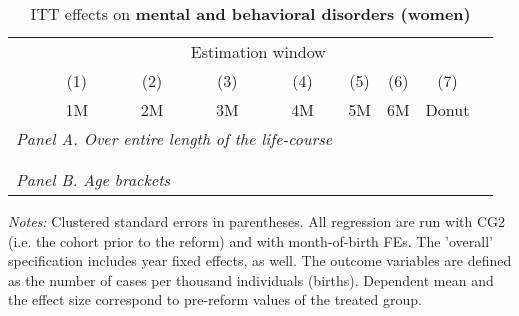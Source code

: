 \vspace*{\fill}
\begin{table}[H] \centering 
	\begin{threeparttable} \centering \caption{ITT effects on \textbf{mental and behavioral disorders (women)}}\label{tab: DD_hopsital2_total}
		{\def\sym#1{\ifmmode^{#1}\else\(^{#1}\)\fi} 
			\begin{tabular}{l*{8}{c}}
				\toprule 
				& \multicolumn{7}{c}{Estimation window} \\ 
				\cmidrule(lr){2-8}
				&\multicolumn{1}{c}{(1)}&\multicolumn{1}{c}{(2)}&\multicolumn{1}{c}{(3)}&\multicolumn{1}{c}{(4)}&\multicolumn{1}{c}{(5)}&\multicolumn{1}{c}{(6)}&\multicolumn{1}{c}{(7)}\\
				&\multicolumn{1}{c}{1M}&\multicolumn{1}{c}{2M}&\multicolumn{1}{c}{3M}&\multicolumn{1}{c}{4M}&\multicolumn{1}{c}{5M}&\multicolumn{1}{c}{6M}&\multicolumn{1}{c}{Donut}\\
				\midrule
				\multicolumn{5}{l}{\emph{Panel A. Over entire length of the life-course}} \\
				 \\ \\
				\multicolumn{5}{l}{\emph{Panel B. Age brackets}} \\
				   
				\bottomrule 
		\end{tabular}}
		\begin{tablenotes} 
			\item \scriptsize \emph{Notes:} Clustered standard errors in parentheses. All regression are run with CG2 (i.e. the cohort prior to the reform) and with month-of-birth FEs. The 'overall' specification includes year fixed effects, as well. The outcome variables are defined as the number of cases per thousand individuals (births). Dependent mean and the effect size correspond to pre-reform values of the treated group.
		\end{tablenotes} 
	\end{threeparttable} 
\end{table}
\vspace*{\fill}\clearpage 